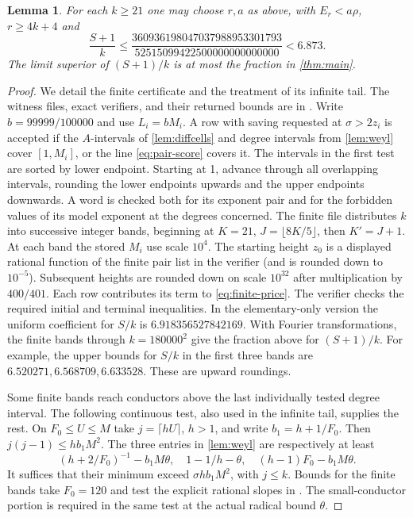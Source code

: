 \documentclass[11pt,letterpaper]{article}
\newtheorem{lemma}[lemma]{Lemma}
\theoremstyle{definition}
\begin{document}
\begin{lemma}\label{lem:coeff}
For each $k\ge21$ one may choose $r,a$ as above, with
$E_r<a\rho$, $r\ge4k+4$ and
\[
 \frac{S+1}{k}\le
 \frac{360936198047037988953301793}{52515099422500000000000000}
 <6.873 .
\]
The limit superior of $(S+1)/k$ is at most the fraction in
\cref{thm:main}.
\end{lemma}
\begin{proof}
We detail the finite certificate and the treatment of its infinite tail.
The witness files, exact verifiers, and their returned bounds are in
\cite{cert}. Write $b=99999/100000$ and use $L_i=bM_i$. A row with
saving requested at $\sigma>2z_i$ is accepted if the $A$-intervals
of \cref{lem:diffcells} and degree intervals from \cref{lem:weyl}
cover $[1,M_i]$, or the line \eqref{eq:pair-score} covers it.
The intervals in the first test are sorted by lower endpoint. Starting
at 1, advance through all overlapping intervals, rounding the lower
endpoints upwards and the upper endpoints downwards. A word is checked
both for its exponent pair and for the forbidden values of its model
exponent at the degrees concerned. The finite file distributes $k$ into
successive integer bands, beginning at $K=21$, $J=\lfloor8K/5\rfloor$,
then $K'=J+1$. At each band the stored $M_i$ use scale $10^4$.
The starting height $z_0$ is a displayed rational function of the finite
pair list in the verifier (and is rounded down to $10^{-5}$). Subsequent
heights are rounded down on scale $10^{32}$ after multiplication by
$400/401$. Each row contributes its term to \eqref{eq:finite-price}.
The verifier checks the required initial and terminal inequalities. In
the elementary-only version the uniform coefficient for $S/k$ is
$6.918356527842169$. With Fourier transformations, the finite bands
through $k=180000^2$ give the fraction above for $(S+1)/k$.
For example, the upper bounds for $S/k$ in the first three bands are
$6.520271,6.568709,6.633528$. These are upward roundings.

Some finite bands reach conductors above the last individually tested
degree interval. The following continuous test, also used in the
infinite tail, supplies the rest. On $F_0\le U\le M$ take
$j=\lceil hU\rceil$, $h>1$, and write $b_1=h+1/F_0$. Then
$j(j-1)\le h b_1 M^2$. The three entries in \cref{lem:weyl}
are respectively at least
\[
 (h+2/F_0)^{-1}-b_1 M\theta,\quad
 1-1/h-\theta,\quad (h-1)F_0-b_1 M\theta .
\]
It suffices that their minimum exceed $\sigma h b_1 M^2$, with
$j\le k$. Bounds for the finite bands take $F_0=120$ and test the
explicit rational slopes in \cite{cert}. The small-conductor portion
is required in the same test at the actual radical bound $\theta$.


\end{proof}
\end{document}
